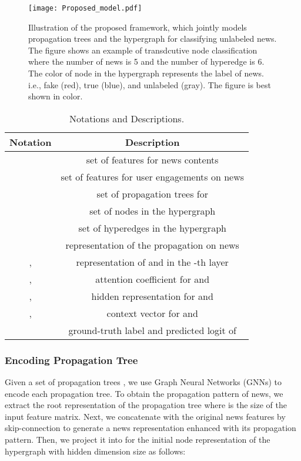 \documentclass[conference]{IEEEtran}
\begin{document}
\begin{figure*}
\centering
\texttt{[image: Proposed\_model.pdf]}
\caption{Illustration of the proposed framework, which jointly models propagation trees and the hypergraph for classifying unlabeled news. The figure shows an example of transdcutive node classification where the number of news is 5 and the number of hyperedge is 6. The color of node in the hypergraph represents the label of news. i.e., fake (red), true (blue), and unlabeled (gray). The figure is best shown in color.} 
\label{proposed_model}
\end{figure*}
\begin{table}
\centering
\caption{Notations and Descriptions.}
\label{notations}
\begin{tabular}{cc}
\hline
 \textbf{Notation} & \textbf{Description}   \\
\hline
\hline
 & set of features for news contents\\
 & set of features for user engagements on news   \\
 & set of propagation trees for  \\
 & set of nodes in the hypergraph  \\
 & set of hyperedges in the hypergraph  \\
 & representation of the propagation on news   \\
,  & representation of  and   in the -th layer  \\
,  & attention coefficient for  and   \\
,   & hidden representation for  and    \\
,  & context vector for  and   \\
 & ground-truth label and predicted logit of   \\
\hline
\end{tabular}
\end{table}

\subsubsection{Encoding Propagation Tree}
Given a set of propagation trees , we use Graph Neural Networks (GNNs) to  encode each propagation tree. To obtain the propagation pattern of news, we extract the root representation of the propagation tree  where  is the size of the input feature matrix. Next, we concatenate   with the original news features  by skip-connection to generate a news representation enhanced with its propagation pattern. Then, we project it into  for the initial node representation of the hypergraph with hidden dimension size  as follows: 
\end{document}
